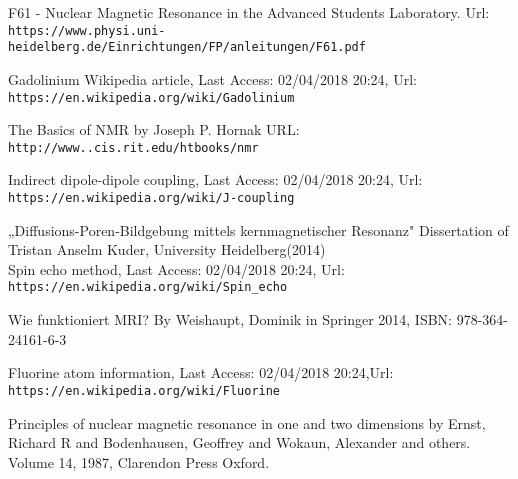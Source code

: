 
	


	

	\maketitle
	
	
	
	
	
	
	
	\begin{thebibliography}{9}
		F61 - Nuclear Magnetic Resonance in the Advanced Students Laboratory. Url: \\\texttt{https://www.physi.uni-heidelberg.de/Einrichtungen/FP/anleitungen/F61.pdf}
	
		Gadolinium Wikipedia article, Last Access: 02/04/2018 20:24, Url: \\
		\texttt{https://en.wikipedia.org/wiki/Gadolinium}
		
			
		The Basics of NMR by Joseph P. Hornak
		URL: \\\texttt{http://www..cis.rit.edu/htbooks/nmr}
		
		
		Indirect dipole-dipole coupling, Last Access: 02/04/2018 20:24, Url: \\
		\texttt{https://en.wikipedia.org/wiki/J-coupling}
		
		„Diffusions-Poren-Bildgebung mittels kernmagnetischer Resonanz"
		Dissertation of Tristan Anselm Kuder, University Heidelberg(2014)\\
		
		Spin echo method, Last Access: 02/04/2018 20:24, Url: \\
		\texttt{https://en.wikipedia.org/wiki/Spin\_echo}
		
		Wie funktioniert MRI? By Weishaupt, Dominik in Springer 2014, ISBN: 978-364-24161-6-3

		Fluorine atom information, Last Access: 02/04/2018 20:24,Url: \\
		\texttt{https://en.wikipedia.org/wiki/Fluorine}
		
		Principles of nuclear magnetic resonance in one and two dimensions by 
		Ernst, Richard R and Bodenhausen, Geoffrey and Wokaun, Alexander and others. Volume 14, 1987, Clarendon Press Oxford.
		
	\end{thebibliography}
	
